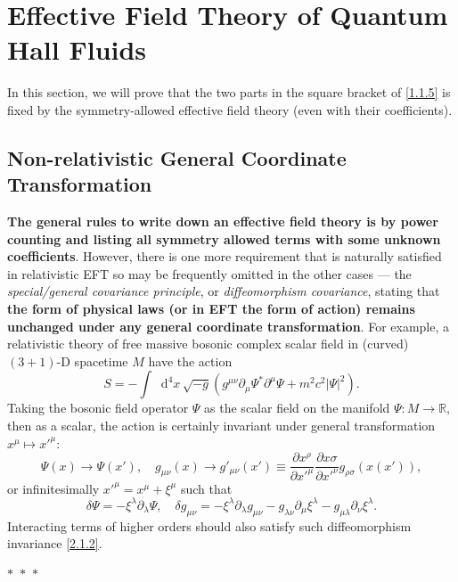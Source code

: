 \documentclass[10pt,nofootinbib,letterpaper]{revtex4}
\newcommand*\dd{\mathop{}\!\mathrm{d}}
\begin{document}
\section{Effective Field Theory of Quantum Hall Fluids}
	In this section, we will prove that the two parts in the square bracket of \eqref{1.1.5} is fixed by the symmetry-allowed effective field theory (even with their coefficients).

	\subsection{Non-relativistic General Coordinate Transformation}
		\textbf{The general rules to write down an effective field theory is by power counting and listing all symmetry allowed terms with some unknown coefficients}. However, there is one more requirement that is naturally satisfied in relativistic EFT so may be frequently omitted in the other cases --- the \emph{special/general covariance principle}, or \emph{diffeomorphism covariance}, stating that \textbf{\color{red}the form of physical laws (or in EFT the form of action) remains unchanged under any general coordinate transformation}. For example, a relativistic theory of free massive bosonic complex scalar field in (curved) $(3+1)$-D spacetime $M$ have the action
		\begin{equation}\label{2.1.1}
			S=-\int\dd^4x\,\sqrt{-g}(g^{\mu\nu}\partial_\mu\Psi^* \partial^\mu\Psi+m^2c^2|\Psi|^2).
		\end{equation}
		Taking the bosonic field operator $\Psi$ as the scalar field on the manifold $\Psi:M\to\mathbb{R}$, then as a scalar, the action is certainly invariant under general transformation $x^\mu\mapsto {x'}^\mu$:
		\begin{equation*}
			\Psi(x)\to\Psi(x'),\quad g_{\mu\nu}(x)\to g'_{\mu\nu}(x')\equiv\dfrac{\partial x^\rho}{\partial{x'}^\mu}\dfrac{\partial x\sigma}{\partial{x'}^\nu}g_{\rho\sigma}(x(x')),
		\end{equation*}
		or infinitesimally ${x'}^\mu=x^\mu+\xi^\mu$ such that
		\begin{equation}\label{2.1.2}
			\delta\Psi=-\xi^\lambda \partial_\lambda\Psi,\quad \delta g_{\mu\nu}=-\xi^\lambda \partial_\lambda g_{\mu\nu}-g_{\lambda\nu}\partial_\mu\xi^\lambda-g_{\mu\lambda}\partial_\nu\xi^\lambda.
		\end{equation}
		Interacting terms of higher orders should also satisfy such diffeomorphism invariance \eqref{2.1.2}.
		\begin{center}
			$\ast$~$\ast$~$\ast$
		\end{center}\par
\end{document}
